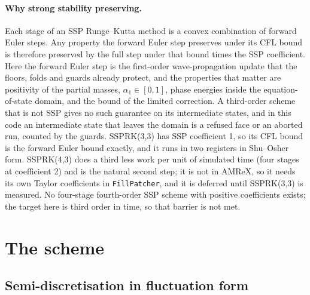 \documentclass[11pt,a4paper]{article}
\newcommand{\code}[1]{\texttt{\small #1}}
\begin{document}
\paragraph{Why strong stability preserving.}
Each stage of an SSP Runge--Kutta method is a convex combination of forward
Euler steps.  Any property the forward Euler step preserves under its CFL
bound is therefore preserved by the full step under that bound times the
SSP coefficient.  Here the forward Euler step is the first-order
wave-propagation update that the floors, folds and guards already protect,
and the properties that matter are positivity of the partial masses,
$\alpha_1\in[0,1]$, phase energies inside the equation-of-state domain,
and the bound of the limited correction.  A third-order scheme that is not
SSP gives no such guarantee on its intermediate states, and in this code an
intermediate state that leaves the domain is a refused face or an aborted
run, counted by the guards.  SSPRK(3,3) has SSP coefficient 1, so its CFL
bound is the forward Euler bound exactly, and it runs in two registers in
Shu--Osher form.  SSPRK(4,3) does a third less work per unit of simulated
time (four stages at coefficient 2) and is the natural second step; it is
not in AMReX, so it needs its own Taylor coefficients in
\code{FillPatcher}, and it is deferred until SSPRK(3,3) is measured.  No
four-stage fourth-order SSP scheme with positive coefficients exists; the
target here is third order in time, so that barrier is not met.

\section{The scheme}
\label{sec:scheme}

\subsection{Semi-discretisation in fluctuation form}
\end{document}
